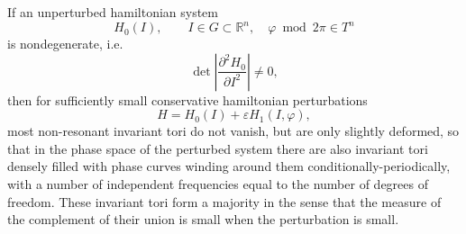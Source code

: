 If an unperturbed hamiltonian system
$$H_0(I), \qquad I \in G \subset \mathbb{R}^n, \quad \varphi \bmod 2\pi \in T^n$$
is nondegenerate, i.e.
$$\det \left| \frac{\partial^2 H_0}{\partial I^2} \right| \neq 0,$$
then for sufficiently small conservative hamiltonian perturbations
$$H = H_0(I) + \varepsilon H_1(I, \varphi),$$
most non-resonant invariant tori do not vanish, but are only slightly deformed, so that in the phase space of the perturbed system there are also invariant tori densely filled with phase curves winding around them conditionally-periodically, with a number of independent frequencies equal to the number of degrees of freedom. These invariant tori form a majority in the sense that the measure of the complement of their union is small when the perturbation is small.
